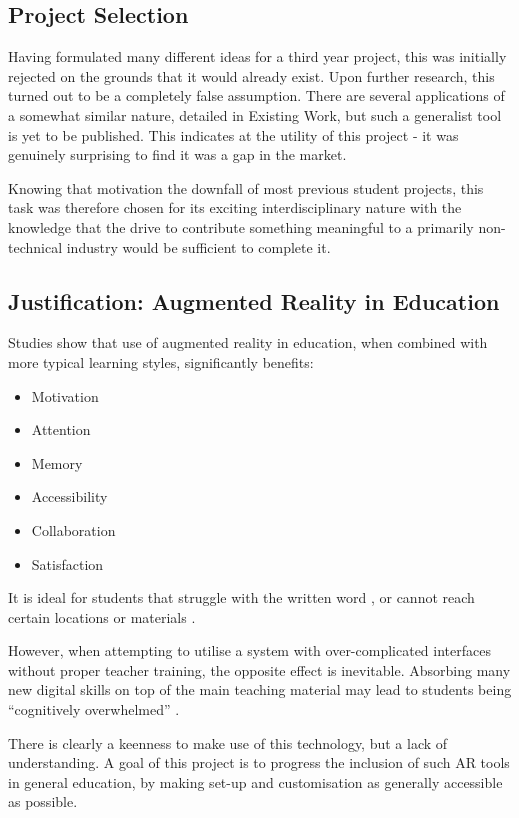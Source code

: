 \documentclass{article}
\begin{document}
\subsection{Project Selection}
Having formulated many different ideas for a third year project, this was initially rejected on the grounds that it would already exist. Upon further research, this turned out to be a completely false assumption. There are several applications of a somewhat similar nature, detailed in Existing Work, but such a generalist tool is yet to be published. This indicates at the utility of this project - it was genuinely surprising to find it was a gap in the market.

Knowing that motivation the downfall of most previous student projects, this task was therefore chosen for its exciting interdisciplinary nature with the knowledge that the drive to contribute something meaningful to a primarily non-technical industry would be sufficient to complete it.

\subsection{Justification: Augmented Reality in Education}
Studies show that use of augmented reality in education, when combined with more typical learning styles, significantly benefits: \cite{education:ARlit}

\begin{itemize}
    \item Motivation
    \item Attention
    \item Memory
    \item Accessibility
    \item Collaboration
    \item Satisfaction
\end{itemize}
It is ideal for students that struggle with the written word \cite{education:class}, or cannot reach certain locations or materials \cite{education:placespotentials}.

However, when attempting to utilise a system with over-complicated interfaces without proper teacher training, the opposite effect is inevitable. Absorbing many new digital skills on top of the main teaching material may lead to students being “cognitively overwhelmed” \cite{education:overwhelm}. 

There is clearly a keenness to make use of this technology, but a lack of understanding. A goal of this project is to progress the inclusion of such AR tools in general education, by making set-up and customisation as generally accessible as possible. 
\end{document}
